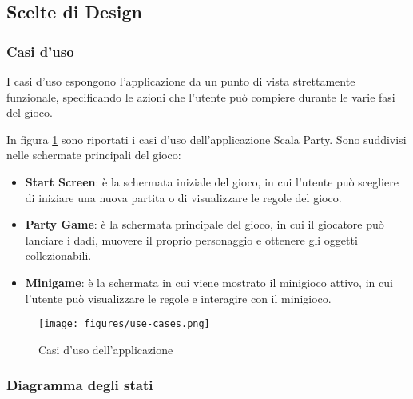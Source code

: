 \subsection{Scelte di Design} \label{sec:design-choices}

\subsubsection{Casi d'uso} \label{sec:design-choices:use-cases}
I casi d'uso espongono l'applicazione da un punto di vista strettamente funzionale,
specificando le azioni che l'utente può compiere durante le varie fasi del gioco.

In figura \ref{fig:use-cases} sono riportati i casi d'uso dell'applicazione Scala Party.
Sono suddivisi nelle schermate principali del gioco:
\begin{itemize}
    \item \textbf{Start Screen}: è la schermata iniziale del gioco, in cui l'utente
    può scegliere di iniziare una nuova partita o di visualizzare le regole del gioco.
    \item \textbf{Party Game}: è la schermata principale del gioco, in cui il giocatore
    può lanciare i dadi, muovere il proprio personaggio e ottenere gli oggetti collezionabili.
    \item \textbf{Minigame}: è la schermata in cui viene mostrato il minigioco
    attivo, in cui l'utente può visualizzare le regole e interagire con il minigioco.
\end{itemize}

\begin{figure}[ht!]
    \centering
    \texttt{[image: figures/use-cases.png]}
    \caption{Casi d'uso dell'applicazione}
    \label{fig:use-cases}
\end{figure}

\subsubsection{Diagramma degli stati} \label{sec:design-choices:state-diagram}

